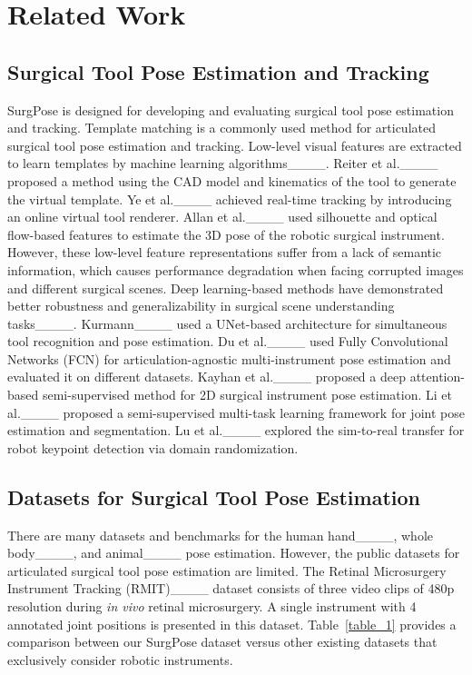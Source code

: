 \section{Related Work}
\subsection{Surgical Tool Pose Estimation and Tracking}
SurgPose is designed for developing and evaluating surgical tool pose estimation and tracking. Template matching is a commonly used method for articulated surgical tool pose estimation and tracking. Low-level visual features are extracted to learn templates by machine learning algorithms____. Reiter et al.____ proposed a method using the CAD model and kinematics of the tool to generate the virtual template. Ye et al.____ achieved real-time tracking by introducing an online virtual tool renderer. 
Allan et al.____ used silhouette and optical flow-based features to estimate the 3D pose of the robotic surgical instrument.
However, these low-level feature representations suffer from a lack of semantic information, which causes performance degradation when facing corrupted images and different surgical scenes.
Deep learning-based methods have demonstrated better robustness and generalizability in surgical scene understanding tasks____. Kurmann____ used a UNet-based architecture for simultaneous tool recognition and pose estimation. Du et al.____ used Fully Convolutional Networks (FCN) for articulation-agnostic multi-instrument pose estimation and evaluated it on different datasets. Kayhan et al.____ proposed a deep attention-based semi-supervised method for 2D surgical instrument pose estimation. Li et al.____ proposed a semi-supervised multi-task learning framework for joint pose estimation and segmentation. Lu et al.____ explored the sim-to-real transfer for robot keypoint detection via domain randomization.

\subsection{Datasets for Surgical Tool Pose Estimation}
There are many datasets and benchmarks for the human hand____, whole body____, and animal____ pose estimation. However, the public datasets for articulated surgical tool pose estimation are limited. The Retinal Microsurgery Instrument Tracking (RMIT)____ dataset consists of three video clips of 480p resolution during \textit{in vivo} retinal microsurgery. A single instrument with 4 annotated joint positions is presented in this dataset. Table~\ref{table_1} provides a comparison between our SurgPose dataset versus other existing datasets that exclusively consider robotic instruments.

